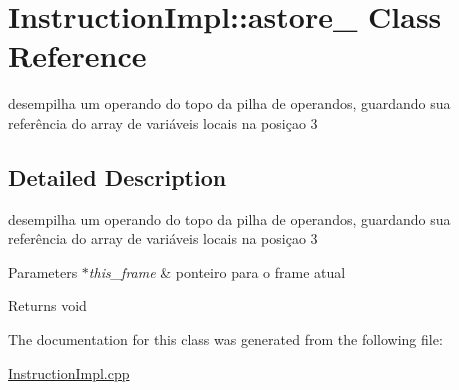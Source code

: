 \hypertarget{class_instruction_impl_1_1astore__3}{}\section{Instruction\+Impl\+:\+:astore\+\_ Class Reference}
\label{class_instruction_impl_1_1astore__3}


desempilha um operando do topo da pilha de operandos, guardando sua referência do array de variáveis locais na posiçao 3  




\subsection{Detailed Description}
desempilha um operando do topo da pilha de operandos, guardando sua referência do array de variáveis locais na posiçao 3 


\begin{DoxyParams}{Parameters}
{\em $\ast$this\+\_\+frame} & ponteiro para o frame atual \\
\hline
\end{DoxyParams}
\begin{DoxyReturn}{Returns}
void 
\end{DoxyReturn}


The documentation for this class was generated from the following file\+:\begin{DoxyCompactItemize}
\item 
\hyperlink{_instruction_impl_8cpp}{Instruction\+Impl.\+cpp}\end{DoxyCompactItemize}
